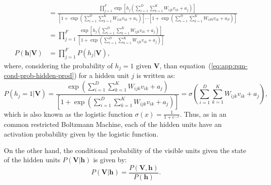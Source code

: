 \begin{align}
    &= \frac{\prod\limits^{F}_{j=1} \exp{\left[h_{j} \left(\sum\limits^{D}_{i=1} \sum\limits^{K}_{k=1} W_{ijk} v_{ik} + a_{j}\right)\right]}}{\left[ 1 + \exp{\left( \sum\limits^{D}_{i=1} \sum\limits^{K}_{k=1} W_{i1k} v_{ik} + a_{1}\right)}\right] \cdots \left[ 1 + \exp{\left( \sum\limits^{D}_{i=1} \sum\limits^{K}_{k=1} W_{iFk} v_{ik} + a_{F}\right)}\right]}  \nonumber \\ %
    &= \prod\limits^{F}_{j=1} \frac{\exp{\left[h_{j} \left(\sum\limits^{D}_{i=1} \sum\limits^{K}_{k=1} W_{ijk} v_{ik} + a_{j}\right)\right]}}{\left[ 1 + \exp{\left( \sum\limits^{D}_{i=1} \sum\limits^{K}_{k=1} W_{ijk} v_{ik} + a_{j}\right)}\right]}  \nonumber \\ %
    \label{eq:app:rsm-cond-prob-hidden-prod}
    P(\mathbf{h} | \mathbf{V}) &= \prod\limits^{F}_{j=1} P(h_{j} | \mathbf{V}),
\end{align}
where, considering the probability of $h_{j} = 1$ given $\mathbf{V}$, than equation~(\ref{eq:app:rsm-cond-prob-hidden-prod}) for a hidden unit $j$ is written as:
\begin{equation}
    \label{eq:app:rsm-hidden-logistic}
    P(h_{j} = 1 | \mathbf{V}) = \frac{\exp{\left(\sum\limits^{D}_{i=1} \sum\limits^{K}_{k=1} W_{ijk} v_{ik} + a_{j} \right)}}{\left[ 1 + \exp{\left(\sum\limits^{D}_{i=1} \sum\limits^{K}_{k=1} W_{ijk} v_{ik} + a_{j} \right)}\right]} = \sigma{\left(\sum\limits^{D}_{i=1} \sum\limits^{K}_{k=1} W_{ijk} v_{ik} + a_{j} \right)}, 
\end{equation}
which is also known as the logistic function $\sigma(x) = \frac{1}{1 + e^{-x}}$.
Thus, as in an common restricted Boltzmann Machine, each of the hidden units have an activation probability given by the logistic function.

On the other hand, the conditional probability of the visible units given the state of the hidden units $P(\mathbf{V} | \mathbf{h})$ is given by:
\begin{equation}
    \label{eq:app:rsm-cond-prob-visible}
    P(\mathbf{V} | \mathbf{h}) = \frac{P(\mathbf{V}, \mathbf{h})}{P(\mathbf{h})}.
\end{equation}

